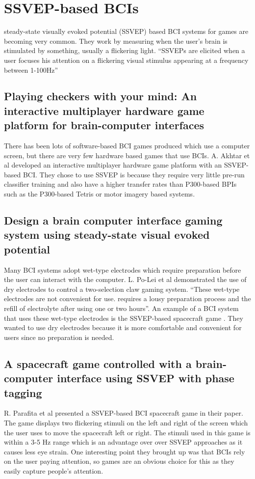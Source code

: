 \documentclass{scrartcl}
\begin{document}
\section*{SSVEP-based BCIs}
steady-state visually evoked potential (SSVEP) based BCI systems for games are becoming very common. They work by measuring when the user's brain is stimulated by something, usually a flickering light. ``SSVEPs are elicited when a user focuses his attention on a flickering visual stimulus appearing at a frequency between 1-100Hz'' \cite{Checkers}

\subsection*{Playing checkers with your mind: An interactive multiplayer hardware game platform for brain-computer interfaces}
There has been lots of software-based BCI games produced which use a computer screen, but there are very few hardware based games that use BCIs. A. Akhtar et al \cite{Checkers} developed an interactive multiplayer hardware game platform with an SSVEP-based BCI. They chose to use SSVEP is because they require very little pre-run classifier training and also have a higher transfer rates than P300-based BPIs such as the P300-based Tetris \cite{TetrisP300} or motor imagery based systems. 

\subsection*{Design a brain computer interface gaming system using steady-state visual evoked potential}
Many BCI systems adopt wet-type electrodes which require preparation before the user can interact with the computer. L. Po-Lei et al \cite{GamingSystem} demonstrated the use of dry electrodes to control a two-selection claw gaming system. ``These wet-type electrodes are not convenient for use. requires a lousy preparation process and the refill of electrolyte after using one or two hours''\cite{GamingSystem}. An example of a BCI system that uses these wet-type electrodes is the SSVEP-based spacecraft game \cite{Spacecraft}. They wanted to use dry electrodes because it is more comfortable and convenient for users since no preparation is needed. 

\subsection*{A spacecraft game controlled with a brain-computer interface using SSVEP with phase tagging}
R. Parafita et al \cite{Spacecraft} presented a SSVEP-based BCI spacecraft game in their paper. The game displays two flickering stimuli on the left and right of the screen which the user uses to move the spacecraft left or right. The stimuli used in this game is within a 3-5 Hz range which is an advantage over over SSVEP approaches as it causes less eye strain. One interesting point they brought up was that BCIs rely on the user paying attention, so games are an obvious choice for this as they easily capture people's attention.  
\end{document}
